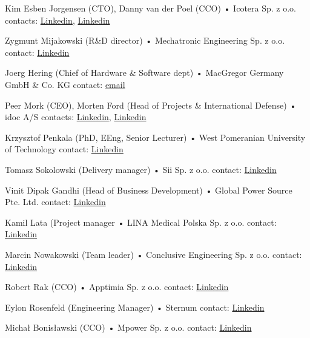 \documentclass{tccv}
\begin{document}
\begin{yearlist}

\item[Kim Esben Jorgensen (CTO), Danny van der Poel (CCO)]{•}
     {Icotera Sp. z o.o.}
     {contacts: \href{https://www.linkedin.com/in/kim-esben-j\%C3\%B8rgensen-8685229/}{Linkedin}, \href{https://www.linkedin.com/in/dannyvanderpoel/}{Linkedin}}

\item[Zygmunt Mijakowski (R\&D director)]{•}
     {Mechatronic Engineering Sp. z o.o.}
     {contact: \href{https://www.linkedin.com/in/zmijakowski/}{Linkedin}}
     
\item[Joerg Hering (Chief of Hardware \& Software dept)]{•}
     {MacGregor Germany GmbH \& Co. KG}
     {contact: \href{mailto:jhe@danelec.com}{email}}
     
\item[Peer Mork (CEO), Morten Ford (Head of Projects \& International Defense)]{•}
     {idoc A/S}
     {contacts: \href{https://www.linkedin.com/in/peermork}{Linkedin}, \href{https://www.linkedin.com/in/morten-ford-08368264}{Linkedin}}
     
\item[Krzysztof Penkala (PhD, EEng, Senior Lecturer)]{•}
     {West Pomeranian University of Technology}
     {contact: \href{https://www.linkedin.com/in/krzysztof-penkala-4a498a26/}{Linkedin}}
     
\item[Tomasz Sokolowski (Delivery manager)]{•}
     {Sii Sp. z o.o.}
     {contact: \href{https://www.linkedin.com/in/tomsok}{Linkedin}}

\item[Vinit Dipak Gandhi (Head of Business Development)]{•}
     {Global Power Source Pte. Ltd. }
     {contact: \href{https://www.linkedin.com/in/vinit-dipak-gandhi-71782612}{Linkedin}}
     
\item[Kamil Lata (Project manager]{•}
     {LINA Medical Polska Sp. z o.o.}
     {contact: \href{https://www.linkedin.com/in/kamil-lata-a71a41138}{Linkedin}}

\item[Marcin Nowakowski (Team leader)]{•}
     {Conclusive Engineering Sp. z o.o.}
     {contact: \href{https://www.linkedin.com/in/marcin-nowakowski-technology}{Linkedin}}
     
\item[Robert Rak (CCO)]{•}
     {Apptimia Sp. z o.o.}
     {contact: \href{https://www.linkedin.com/in/robert-rak-4018a64a}{Linkedin}}

\item[Eylon Rosenfeld (Engineering Manager)]{•}
     {Sternum}
     {contact: \href{https://www.linkedin.com/in/eylon-rosenfeld}{Linkedin}}

\item[Michał Bonisławski (CCO)]{•}
     {Mpower Sp. z o.o.}
     {contact: \href{https://www.linkedin.com/in/micha\%C5\%82-bonis\%C5\%82awski-322bb91aa}{Linkedin}}

\end{yearlist}
\end{document}
